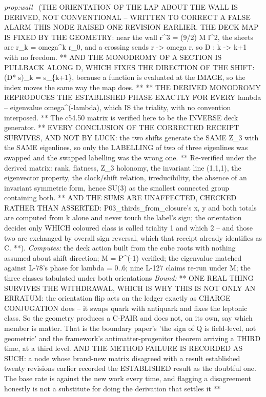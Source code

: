 \begin{description}
\textit{prop:wall} \ (THE ORIENTATION OF THE LAP ABOUT THE WALL IS DERIVED, NOT CONVENTIONAL -- WRITTEN TO CORRECT A FALSE ALARM THIS NODE RAISED ONE REVISION EARLIER. THE DECK MAP IS FIXED BY THE GEOMETRY: near the wall r\textasciicircum{}3 = (9/2) M l\textasciicircum{}2, the sheets are r\_k = omega\textasciicircum{}k r\_0, and a crossing sends r -> omega r, so D : k -> k+1 with no freedom. ** AND THE MONODROMY OF A SECTION IS PULLBACK ALONG D, WHICH FIXES THE DIRECTION OF THE SHIFT: (D* s)\_k = s\_\{k+1\}, because a function is evaluated at the IMAGE, so the index moves the same way the map does. ** ** THE DERIVED MONODROMY REPRODUCES THE ESTABLISHED PHASE EXACTLY FOR EVERY lambda -- eigenvalue omega\textasciicircum{}(-lambda), which IS the triality, with no convention interposed. ** The c54.50 matrix is verified here to be the INVERSE deck generator. ** EVERY CONCLUSION OF THE CORRECTED RECEIPT SURVIVES, AND NOT BY LUCK: the two shifts generate the SAME Z\_3 with the SAME eigenlines, so only the LABELLING of two of three eigenlines was swapped and the swapped labelling was the wrong one. ** Re-verified under the derived matrix: rank, flatness, Z\_3 holonomy, the invariant line (1,1,1), the eigenvector property, the clock/shift relation, irreducibility, the absence of an invariant symmetric form, hence SU(3) as the smallest connected group containing both. ** AND THE SUMS ARE UNAFFECTED, CHECKED RATHER THAN ASSERTED: P03\_thirds\_from\_closure's x, y and both totals are computed from k alone and never touch the label's sign; the orientation decides only WHICH coloured class is called triality 1 and which 2 -- and those two are exchanged by overall sign reversal, which that receipt already identifies as C. **). 
\emph{Computes:} the deck action built from the cube roots with nothing assumed about shift direction; M = P\textasciicircum{}(-1) verified; the eigenvalue matched against L-78's phase for lambda = 0..6; nine L-127 claims re-run under M; the three classes tabulated under both orientations
 \emph{Bound:} ** ONE REAL THING SURVIVES THE WITHDRAWAL, WHICH IS WHY THIS IS NOT ONLY AN ERRATUM: the orientation flip acts on the ledger exactly as CHARGE CONJUGATION does -- it swaps quark with antiquark and fixes the leptonic class. So the geometry produces a C-PAIR and does not, on its own, say which member is matter. That is the boundary paper's 'the sign of Q is field-level, not geometric' and the framework's antimatter-progenitor theorem arriving a THIRD time, at a third level. AND THE METHOD FAILURE IS RECORDED AS SUCH: a node whose brand-new matrix disagreed with a result established twenty revisions earlier recorded the ESTABLISHED result as the doubtful one. The base rate is against the new work every time, and flagging a disagreement honestly is not a substitute for doing the derivation that settles it **

\end{description}
